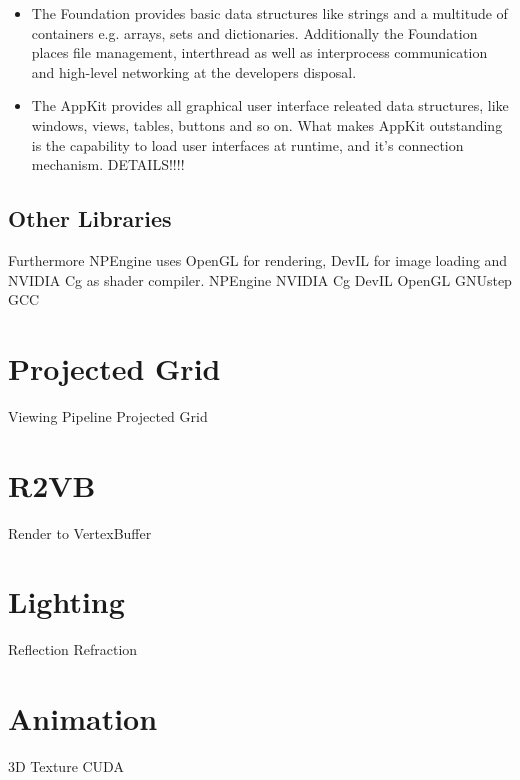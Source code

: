 \begin{itemize}

\item The Foundation provides basic data structures like strings and a multitude
of containers e.g. arrays, sets and dictionaries. Additionally the Foundation
places file management, interthread as well as interprocess communication and
high-level networking at the developers disposal.

\item The AppKit provides all graphical user interface releated data
structures, like windows, views, tables, buttons and so on. What makes AppKit
outstanding is the capability to load user interfaces at runtime, and it's
connection mechanism. DETAILS!!!!

\end{itemize}

\subsection{Other Libraries}

Furthermore NPEngine uses OpenGL for rendering, DevIL for image loading and
NVIDIA Cg as shader compiler.
NPEngine
NVIDIA Cg
DevIL
OpenGL
GNUstep
GCC

\section{Projected Grid}
Viewing Pipeline
Projected Grid

\section{R2VB}
Render to VertexBuffer

\section{Lighting}
Reflection
Refraction

\section{Animation}
3D Texture
CUDA